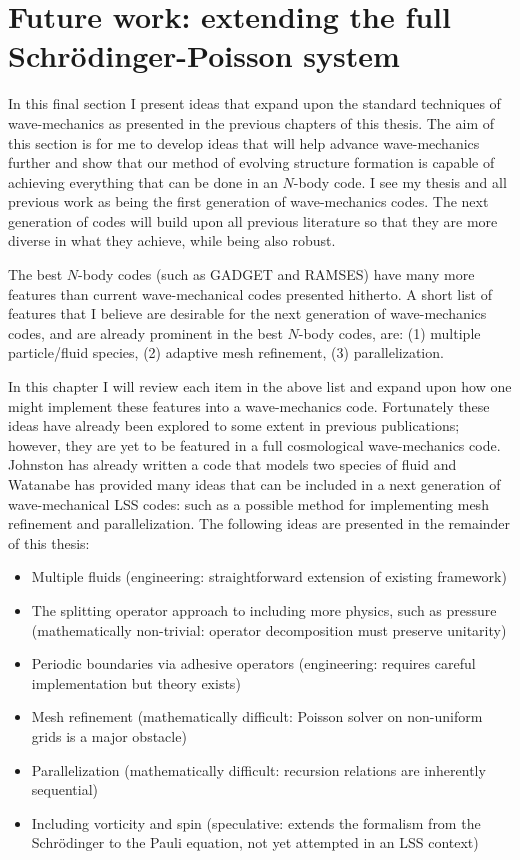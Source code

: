 \section{Future work: extending the full Schr\"odinger-Poisson system}
In this final section I present ideas that expand upon the standard techniques of wave-mechanics as presented in the previous chapters of this thesis. The aim of this section is for me to develop ideas that will help advance wave-mechanics further and show that our method of evolving structure formation is capable of achieving everything that can be done in an $N$-body code. I see my thesis and all previous work as being the first generation of wave-mechanics codes. The next generation of codes will build upon all previous literature so that they are more diverse in what they achieve, while being also robust.

The best $N$-body codes (such as GADGET and RAMSES) have many more features than current wave-mechanical codes presented hitherto. A short list of features that I believe are desirable for the next generation of wave-mechanics codes, and are already prominent in the best $N$-body codes, are: 
(1) multiple particle/fluid species, (2) adaptive mesh refinement, (3) parallelization.

In this chapter I will review each item in the above list and expand upon how one might implement these features into a wave-mechanics code. Fortunately these ideas have already been explored to some extent in previous publications; however, they are yet to be featured in a full cosmological wave-mechanics code. Johnston \citep{bib_rj} has already written a code that models two species of fluid and Watanabe \citep{bib_wat} has provided many ideas that can be included in a next generation of wave-mechanical LSS codes: such as a possible method for implementing mesh refinement and parallelization. The following ideas are presented in the remainder of this thesis:

\begin{itemize}
\item Multiple fluids (engineering: straightforward extension of existing framework)
\item The splitting operator approach to including more physics, such as pressure (mathematically non-trivial: operator decomposition must preserve unitarity)
\item Periodic boundaries via adhesive operators (engineering: requires careful implementation but theory exists)
\item Mesh refinement (mathematically difficult: Poisson solver on non-uniform grids is a major obstacle)
\item Parallelization (mathematically difficult: recursion relations are inherently sequential)
\item Including vorticity and spin (speculative: extends the formalism from the Schr\"odinger to the Pauli equation, not yet attempted in an LSS context)
\end{itemize}

